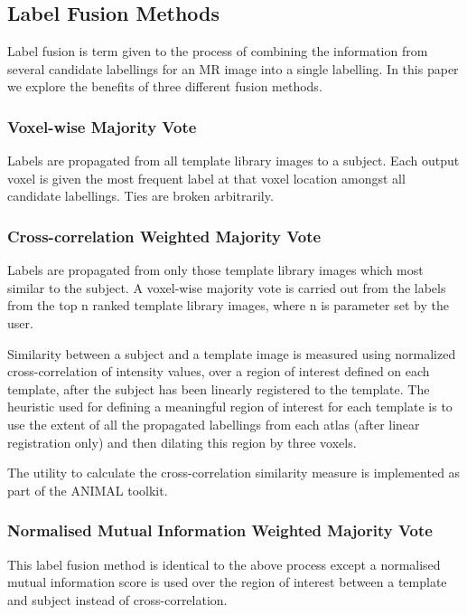 \documentclass{article}\usepackage{graphicx, color}
\newcommand{\marginnote}[1]{\-\marginpar[\raggedleft\footnotesize #1]{\raggedright\footnotesize #1}}
\newcommand{\todo}[1]{\marginnote{\textcolor{red}{TODO #1}}}
\begin{document}
\subsection{Label Fusion Methods}

Label fusion is term given to the process of combining the information from
several candidate labellings for an MR image into a single labelling.  In this
paper we explore the benefits of three different fusion methods. 

\subsubsection{Voxel-wise Majority Vote}

Labels are propagated from all template library images to a subject.  Each
output voxel is given the most frequent label at that voxel location amongst
all candidate labellings.  Ties are broken arbitrarily.

\subsubsection{Cross-correlation Weighted Majority Vote}

Labels are propagated from only those template library images which most
similar to the subject.  A voxel-wise majority vote is carried out from the
labels from the top n ranked template library images, where n is parameter set
by the user. 

Similarity between a subject and a template image is measured using normalized
cross-correlation of intensity values, over a region of interest defined on
each template, after the subject has been linearly registered to the template.
The heuristic used for defining a meaningful region of interest for each
template is to use the extent of all the propagated labellings from each atlas
(after linear registration only) and then dilating this region by three voxels.
 
The utility to calculate the cross-correlation similarity measure is
implemented as part of the ANIMAL toolkit. \todo{(ANIMAL or MINC)}

\subsubsection{Normalised Mutual Information Weighted Majority Vote}

This label fusion method is identical to the above process except a normalised
mutual information score is used over the region of interest between a template
and subject instead of cross-correlation.  
\end{document}
